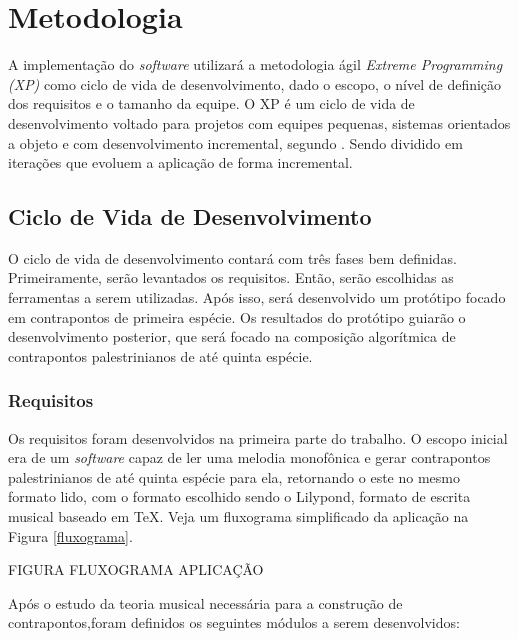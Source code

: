 \chapter[Metodologia]{Metodologia}

  A implementação do \textit{software} utilizará a metodologia ágil \textit{Extreme Programming (XP)} como ciclo de vida de desenvolvimento, dado o escopo, o nível de definição dos requisitos e o tamanho da equipe. O XP é um ciclo de vida de desenvolvimento voltado para projetos com equipes pequenas, sistemas orientados a objeto e com desenvolvimento incremental, segundo . Sendo dividido em iterações que evoluem a aplicação de forma incremental.

  \section[Ciclo de Vida de Desenvolvimento]{Ciclo de Vida de Desenvolvimento}

    O ciclo de vida de desenvolvimento contará com três fases bem definidas. Primeiramente, serão levantados os requisitos. Então, serão escolhidas as ferramentas a serem utilizadas. Após isso, será desenvolvido um protótipo focado em contrapontos de primeira espécie. Os resultados do protótipo guiarão o desenvolvimento posterior, que será focado na composição algorítmica de contrapontos palestrinianos de até quinta espécie.

  \subsection[Requisitos]{Requisitos}

    Os requisitos foram desenvolvidos na primeira parte do trabalho. O escopo inicial era de um \textit{software} capaz de ler uma melodia monofônica e gerar contrapontos palestrinianos de até quinta espécie para ela, retornando o este no mesmo formato lido, com o formato escolhido sendo o Lilypond\footnotemark {}, formato de escrita musical baseado em TeX. Veja um fluxograma simplificado da aplicação na Figura \ref{fluxograma}.

    FIGURA FLUXOGRAMA APLICAÇÃO

    Após o estudo da teoria musical necessária para a construção de contrapontos,foram definidos os seguintes módulos a serem desenvolvidos:

